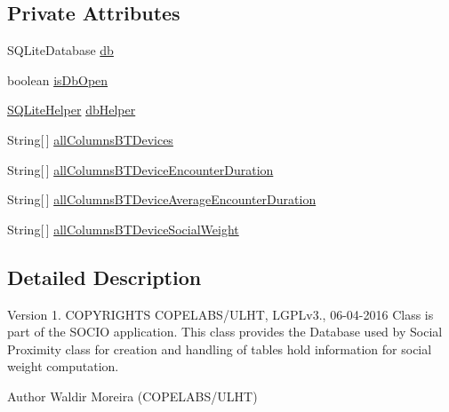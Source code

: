 \subsection*{Private Attributes}
\begin{DoxyCompactItemize}
\item 
S\+Q\+Lite\+Database \hyperlink{classcom_1_1copelabs_1_1oiframework_1_1socialproximity_1_1_data_base_a5f830f25de42020143a3481e4c687037}{db}
\item 
boolean \hyperlink{classcom_1_1copelabs_1_1oiframework_1_1socialproximity_1_1_data_base_abd8a8b73edfc93d99b10439733273220}{is\+Db\+Open}
\item 
\hyperlink{classcom_1_1copelabs_1_1oiframework_1_1socialproximity_1_1_s_q_lite_helper}{S\+Q\+Lite\+Helper} \hyperlink{classcom_1_1copelabs_1_1oiframework_1_1socialproximity_1_1_data_base_a4cb37e38a2ceb667978d5f28bfb199ae}{db\+Helper}
\item 
String\mbox{[}$\,$\mbox{]} \hyperlink{classcom_1_1copelabs_1_1oiframework_1_1socialproximity_1_1_data_base_aa4b93c819020054cb701c58f05596ccd}{all\+Columns\+B\+T\+Devices}
\item 
String\mbox{[}$\,$\mbox{]} \hyperlink{classcom_1_1copelabs_1_1oiframework_1_1socialproximity_1_1_data_base_a2d4588f35ae5dbb0fd852124e2960c46}{all\+Columns\+B\+T\+Device\+Encounter\+Duration}
\item 
String\mbox{[}$\,$\mbox{]} \hyperlink{classcom_1_1copelabs_1_1oiframework_1_1socialproximity_1_1_data_base_a9d9e2c5f94f3e5421fcc03df0f4a1aea}{all\+Columns\+B\+T\+Device\+Average\+Encounter\+Duration}
\item 
String\mbox{[}$\,$\mbox{]} \hyperlink{classcom_1_1copelabs_1_1oiframework_1_1socialproximity_1_1_data_base_a28d6c47831c7bea5716b8e35f9a34e67}{all\+Columns\+B\+T\+Device\+Social\+Weight}
\end{DoxyCompactItemize}


\subsection{Detailed Description}
\begin{DoxyVersion}{Version}
1. C\+O\+P\+Y\+R\+I\+G\+H\+T\+S C\+O\+P\+E\+L\+A\+B\+S/\+U\+L\+H\+T, L\+G\+P\+Lv3., 06-\/04-\/2016 Class is part of the S\+O\+C\+I\+O application. This class provides the Database used by Social Proximity class for creation and handling of tables hold information for social weight computation. 
\end{DoxyVersion}
\begin{DoxyAuthor}{Author}
Waldir Moreira (C\+O\+P\+E\+L\+A\+B\+S/\+U\+L\+H\+T) 
\end{DoxyAuthor}


